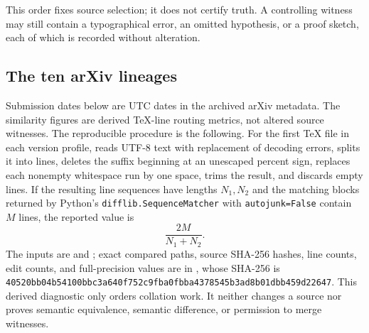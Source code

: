This order fixes source selection; it does not certify truth.  A controlling
witness may still contain a typographical error, an omitted hypothesis, or a
proof sketch, each of which is recorded without alteration.

\subsection{The ten arXiv lineages}

Submission dates below are UTC dates in the archived arXiv metadata.  The
similarity figures are derived TeX-line routing metrics, not altered source
witnesses.  The reproducible procedure is the following.  For the first TeX
file in each version profile, 
 reads UTF-8 text with replacement of
decoding errors, splits it into lines, deletes the suffix beginning at an
unescaped percent sign, replaces each nonempty whitespace run by one space,
trims the result, and discards empty lines.  If the resulting line sequences
have lengths $N_1,N_2$ and the matching blocks returned by Python's
\texttt{difflib.SequenceMatcher} with \texttt{autojunk=False} contain $M$
lines, the reported value is
\[
 \frac{2M}{N_1+N_2}.
\]
The inputs are
 and
; exact compared paths,
source SHA-256 hashes, line counts, edit counts, and full-precision values are
in , whose SHA-256 is
\nolinkurl{40520bb04b54100bbc3a640f752c9fba0fbba4378545b3ad8b01dbb459d22647}.
This derived diagnostic only orders collation work.  It neither changes a
source nor proves semantic equivalence, semantic difference, or permission to
merge witnesses.

